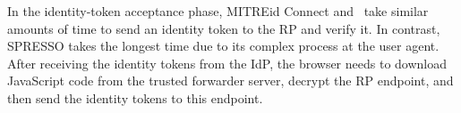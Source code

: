 In the identity-token acceptance phase, MITREid Connect and \usso\ take similar amounts of time to send an identity token to the RP and verify it.
In contrast, SPRESSO takes the longest time due to its complex process at the user agent.
After receiving the identity tokens from the IdP, the browser needs to download JavaScript code from the trusted forwarder server, decrypt the RP endpoint, and then send the identity tokens to this endpoint.

